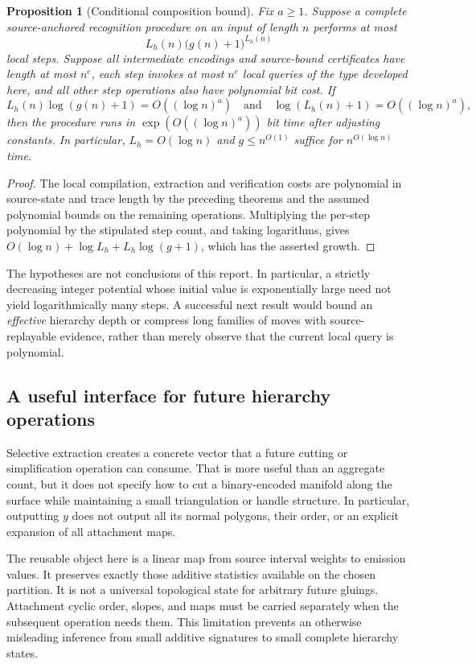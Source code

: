 \documentclass[11pt]{article}
\newtheorem{proposition}[theorem]{Proposition}
\theoremstyle{definition}\newtheorem{definition}[theorem]{Definition}
\theoremstyle{remark}\newtheorem{remark}[theorem]{Remark}
\begin{document}
\begin{proposition}[Conditional composition bound]
\label{prop:global}
Fix $a\ge1$. Suppose a complete source-anchored recognition procedure on an input of length
$n$ performs at most
\[
 L_h(n)\bigl(g(n)+1\bigr)^{L_h(n)}
\]
local steps. Suppose all intermediate encodings and source-bound certificates
have length at most $n^c$, each step invokes at most $n^c$ local queries of the
type developed here, and all \emph{other} step operations also have polynomial
bit cost. If
\[
 L_h(n)\log(g(n)+1)=O((\log n)^a)
 \quad\text{and}\quad \log(L_h(n)+1)=O((\log n)^a),
\]
then the procedure runs in $\exp(O((\log n)^a))$ bit time after adjusting constants.
In particular, $L_h=O(\log n)$ and $g\le n^{O(1)}$ suffice for
$n^{O(\log n)}$ time.
\end{proposition}
\begin{proof}
The local compilation, extraction and verification costs are polynomial in
source-state and trace length by the preceding theorems and the assumed
polynomial bounds on the remaining operations. Multiplying the per-step
polynomial by the stipulated step count, and taking logarithms, gives
$O(\log n)+\log L_h+L_h\log(g+1)$, which has the asserted growth.
\end{proof}

The hypotheses are not conclusions of this report. In particular, a strictly
decreasing integer potential whose initial value is exponentially large need
not yield logarithmically many steps. A successful next result would bound an
\emph{effective} hierarchy depth or compress long families of moves with
source-replayable evidence, rather than merely observe that the current local
query is polynomial.

\subsection{A useful interface for future hierarchy operations}
Selective extraction creates a concrete vector that a future cutting or
simplification operation can consume. That is more useful than an aggregate
count, but it does not specify how to cut a binary-encoded manifold along the
surface while maintaining a small triangulation or handle structure. In
particular, outputting $y$ does not output all its normal polygons, their order,
or an explicit expansion of all attachment maps.

The reusable object here is a linear map from source interval weights to
emission values. It preserves exactly those additive statistics available on the
chosen partition. It is not a universal topological state for arbitrary future
gluings. Attachment cyclic order, slopes, and maps must be carried separately
when the subsequent operation needs them. This limitation prevents an otherwise
misleading inference from small additive signatures to small complete hierarchy
states.
\end{document}
